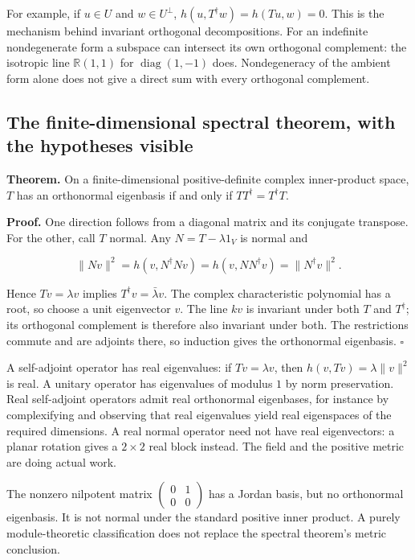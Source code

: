 \documentclass[
  11pt,
]{article}
\begin{document}
For example, if \(u\in U\) and \(w\in U^\perp\),
\(h(u,T^\dagger w)=h(Tu,w)=0\). This is the mechanism behind invariant
orthogonal decompositions. For an indefinite nondegenerate form a
subspace can intersect its own orthogonal complement: the isotropic line
\(\mathbb R(1,1)\) for \(\operatorname{diag}(1,-1)\) does. Nondegeneracy
of the ambient form alone does not give a direct sum with every
orthogonal complement.

\subsection{The finite-dimensional spectral theorem, with the hypotheses
visible}\label{the-finite-dimensional-spectral-theorem-with-the-hypotheses-visible}

\textbf{Theorem.} On a finite-dimensional positive-definite complex
inner-product space, \(T\) has an orthonormal eigenbasis if and only if
\(TT^\dagger=T^\dagger T\).

\textbf{Proof.} One direction follows from a diagonal matrix and its
conjugate transpose. For the other, call \(T\) normal. Any
\(N=T-\lambda1_V\) is normal and

\[\|Nv\|^2=h(v,N^\dagger Nv)
=h(v,NN^\dagger v)=\|N^\dagger v\|^2.\]

Hence \(Tv=\lambda v\) implies \(T^\dagger v=\bar\lambda v\). The
complex characteristic polynomial has a root, so choose a unit
eigenvector \(v\). The line \(kv\) is invariant under both \(T\) and
\(T^\dagger\); its orthogonal complement is therefore also invariant
under both. The restrictions commute and are adjoints there, so
induction gives the orthonormal eigenbasis. \(\square\)

A self-adjoint operator has real eigenvalues: if \(Tv=\lambda v\), then
\(h(v,Tv)=\lambda\|v\|^2\) is real. A unitary operator has eigenvalues
of modulus \(1\) by norm preservation. Real self-adjoint operators admit
real orthonormal eigenbases, for instance by complexifying and observing
that real eigenvalues yield real eigenspaces of the required dimensions.
A real normal operator need not have real eigenvectors: a planar
rotation gives a \(2\times2\) real block instead. The field and the
positive metric are doing actual work.

The nonzero nilpotent matrix \(\begin{pmatrix}0&1\\0&0\end{pmatrix}\)
has a Jordan basis, but no orthonormal eigenbasis. It is not normal
under the standard positive inner product. A purely module-theoretic
classification does not replace the spectral theorem's metric
conclusion.
\end{document}
